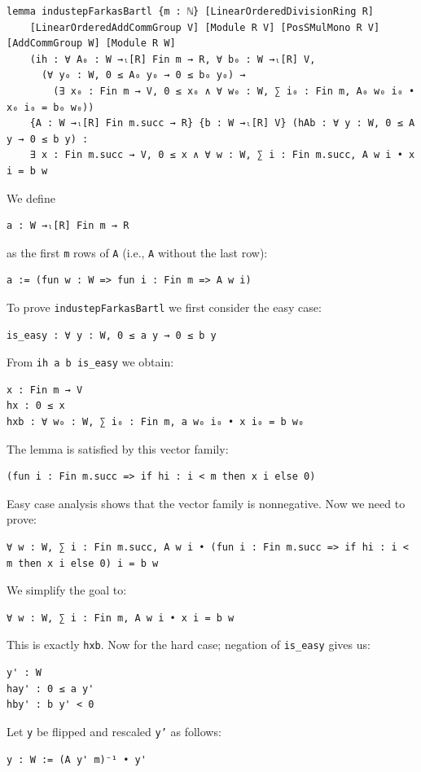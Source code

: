 \documentclass[]{article}
\renewcommand{\.}{\hskip .75pt}
\begin{document}
\begin{lstlisting}
lemma industepFarkasBartl {m : ℕ} [LinearOrderedDivisionRing R]
    [LinearOrderedAddCommGroup V] [Module R V] [PosSMulMono R V] [AddCommGroup W] [Module R W]
    (ih : ∀ A₀ : W →ₗ[R] Fin m → R, ∀ b₀ : W →ₗ[R] V,
      (∀ y₀ : W, 0 ≤ A₀ y₀ → 0 ≤ b₀ y₀) →
        (∃ x₀ : Fin m → V, 0 ≤ x₀ ∧ ∀ w₀ : W, ∑ i₀ : Fin m, A₀ w₀ i₀ • x₀ i₀ = b₀ w₀))
    {A : W →ₗ[R] Fin m.succ → R} {b : W →ₗ[R] V} (hAb : ∀ y : W, 0 ≤ A y → 0 ≤ b y) :
    ∃ x : Fin m.succ → V, 0 ≤ x ∧ ∀ w : W, ∑ i : Fin m.succ, A w i • x i = b w
\end{lstlisting}
We define
\begin{lstlisting}
a : W →ₗ[R] Fin m → R
\end{lstlisting}
as the first \texttt{m} rows of \texttt{A} (i.e., \texttt{A} without the last row):
\begin{lstlisting}
a := (fun w : W => fun i : Fin m => A w i)
\end{lstlisting}
To prove \texttt{industepFarkasBartl} we first consider the easy case:
\begin{lstlisting}
is_easy : ∀ y : W, 0 ≤ a y → 0 ≤ b y
\end{lstlisting}
From \texttt{ih a b is\_easy} we obtain:
\begin{lstlisting}
x : Fin m → V
hx : 0 ≤ x
hxb : ∀ w₀ : W, ∑ i₀ : Fin m, a w₀ i₀ • x i₀ = b w₀
\end{lstlisting}
The lemma is satisfied by this vector family:
\begin{lstlisting}
(fun i : Fin m.succ => if hi : i < m then x i else 0)
\end{lstlisting}
Easy case analysis shows that the vector family is nonnegative.
Now we need to prove:
\begin{lstlisting}
∀ w : W, ∑ i : Fin m.succ, A w i • (fun i : Fin m.succ => if hi : i < m then x i else 0) i = b w
\end{lstlisting}
We simplify the goal to:
\begin{lstlisting}
∀ w : W, ∑ i : Fin m, A w i • x i = b w
\end{lstlisting}
This is exactly \texttt{hxb}. \newpage \noindent
Now for the hard case; negation of \texttt{is\_easy} gives us:
\begin{lstlisting}
y' : W
hay' : 0 ≤ a y'
hby' : b y' < 0
\end{lstlisting}
Let \texttt{y} be flipped and rescaled \texttt{y'} as follows:
\begin{lstlisting}
y : W := (A y' m)⁻¹ • y'
\end{lstlisting}
\end{document}
